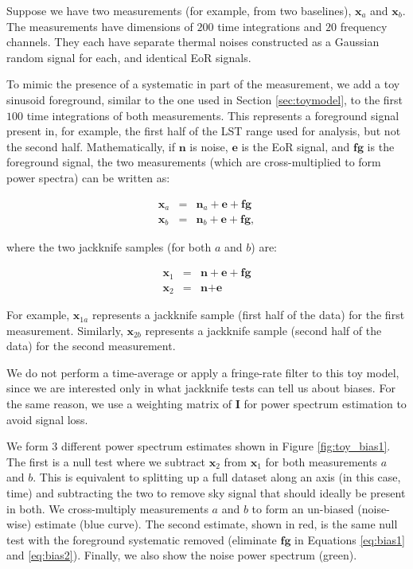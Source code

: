\documentclass[preprint2,numberedappendix,tighten]{aastex6}  %
\begin{document}
Suppose we have two measurements (for example, from two baselines), $\textbf{x}_{a}$ and $\textbf{x}_{b}$. The measurements have dimensions of $200$ time integrations and $20$ frequency channels. They each have separate thermal noises constructed as a Gaussian random signal for each, and identical EoR signals. 

To mimic the presence of a systematic in part of the measurement, we add a toy sinusoid foreground, similar to the one used in Section \ref{sec:toymodel}, to the first $100$ time integrations of both measurements. This represents a foreground signal present in, for example, the first half of the LST range used for analysis, but not the second half. Mathematically, if  $\textbf{n}$ is noise, $\textbf{e}$ is the EoR signal, and $\textbf{fg}$ is the foreground signal, the two measurements (which are cross-multiplied to form power spectra) can be written as:

\begin{eqnarray}
\label{eq:bias1}
\textbf{x}_{a} &=& \textbf{n}_{a} + \textbf{e} + \textbf{fg} \\
\label{eq:bias2}
\textbf{x}_{b} &=& \textbf{n}_{b} + \textbf{e} + \textbf{fg},
\end{eqnarray}

\noindent where the two jackknife samples (for both $a$ and $b$) are:

\begin{eqnarray}
\textbf{x}_{1} &=& \textbf{n} + \textbf{e} + \textbf{fg} \\
\textbf{x}_{2} &=& \textbf{n} + \textbf{e} 
\end{eqnarray}

\noindent For example, $\textbf{x}_{1a}$ represents a jackknife sample (first half of the data) for the first measurement. Similarly, $\textbf{x}_{2b}$ represents a jackknife sample (second half of the data) for the second measurement.

We do not perform a time-average or apply a fringe-rate filter to this toy model, since we are interested only in what jackknife tests can tell us about biases. For the same reason, we use a weighting matrix of $\textbf{I}$ for power spectrum estimation to avoid signal loss. 

We form $3$ different power spectrum estimates shown in Figure \ref{fig:toy_bias1}. The first is a null test where we subtract $\textbf{x}_{2}$ from $\textbf{x}_{1}$ for both measurements $a$ and $b$. This is equivalent to splitting up a full dataset along an axis (in this case, time) and subtracting the two to remove sky signal that should ideally be present in both. We cross-multiply measurements $a$ and $b$ to form an un-biased (noise-wise) estimate (blue curve). The second estimate, shown in red, is the same null test with the foreground systematic removed (eliminate $\textbf{fg}$ in Equations \ref{eq:bias1} and \ref{eq:bias2}). Finally, we also show the noise power spectrum (green).
\end{document}
